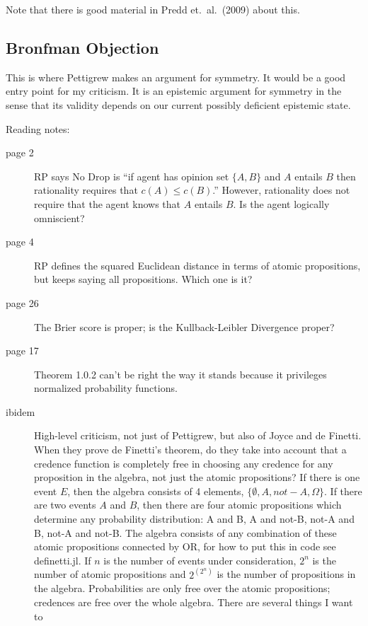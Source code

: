 \documentclass[12pt]{article}
\begin{document}
Note that there is good material in Predd et.\ al.\ (2009) about this.

\subsection{Bronfman Objection}
\label{subsection:bronfman}

This is where Pettigrew makes an argument for symmetry. It would be a
good entry point for my criticism. It is an epistemic argument for
symmetry in the sense that its validity depends on our current
possibly deficient epistemic state.

Reading notes:

\begin{description}
\item[page 2] RP says No Drop is ``if agent has opinion set $\{A,B\}$
  and $A$ entails $B$ then rationality requires that
  $c(A)\leq{}c(B)$.'' However, rationality does not require that the
  agent knows that $A$ entails $B$. Is the agent logically omniscient?
\item[page 4] RP defines the squared Euclidean distance in terms of
  atomic propositions, but keeps saying all propositions. Which one is
  it?
\item[page 26] The Brier score is proper; is the Kullback-Leibler
Divergence proper?
\item[page 17] Theorem 1.0.2 can't be right the way it stands because
  it privileges normalized probability functions.
\item[ibidem] High-level criticism, not just of Pettigrew, but also of
  Joyce and de Finetti. When they prove de Finetti's theorem, do they
  take into account that a credence function is completely free in
  choosing any credence for any proposition in the algebra, not just
  the atomic propositions? If there is one event $E$, then the algebra
  consists of 4 elements, $\{\emptyset, A, not-A, \Omega\}$. If there
  are two events $A$ and $B$, then there are four atomic propositions
  which determine any probability distribution: A and B, A and not-B,
  not-A and B, not-A and not-B. The algebra consists of any
  combination of these atomic propositions connected by OR, for how to
  put this in code see definetti.jl. If $n$ is the number of events
  under consideration, $2^n$ is the number of atomic propositions and
  $2^(2^n)$ is the number of propositions in the algebra.
  Probabilities are only free over the atomic propositions; credences
  are free over the whole algebra. There are several things I want to

\end{description}
\end{document}
